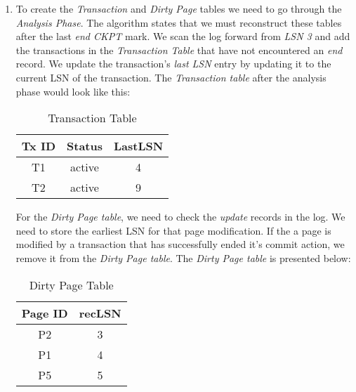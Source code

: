 \documentclass{article}      %
\begin{document}
\begin{enumerate}
\item %

To create the \emph{Transaction} and \emph{Dirty Page} tables we need to go through the \emph{Analysis Phase}. The algorithm states that we must reconstruct these tables after the last \emph{end CKPT} mark. We scan the log forward from \emph{LSN 3} and add the transactions in the \emph{Transaction Table} that have not encountered an \emph{end} record. We update the transaction's  \emph{last LSN} entry by updating it to the current LSN of the transaction. The \emph{Transaction table} after the analysis phase would look like this: \\

\begin{table}[h]
\begin{center}
\begin{tabular}{|c|c|c|}
\hline
\textbf{Tx ID} & \textbf{Status} & \textbf{LastLSN} \\ \hline
T1             & active          & 4                \\ 
T2             & active          & 9                \\ \hline
\end{tabular}
\caption{Transaction Table}
\label{Transaction Table}
\end{center}
\end{table}

For the \emph{Dirty Page table}, we need to check the \emph{update} records in the log. We need to store the earliest LSN for that page modification. If the a page is modified by a transaction that has successfully ended it's commit action, we remove it from the \emph{Dirty Page table}. The \emph{Dirty Page table} is presented below:\\

\begin{table}[h]
\begin{center}
\begin{tabular}{|c|c|}
\hline
\textbf{Page ID} & \textbf{recLSN} \\ 
\hline
P2               & 3               \\
P1               & 4               \\
P5               & 5               \\ 
\hline
\end{tabular}
\caption{Dirty Page Table}
\label{Dirty Page Table}
\end{center}
\end{table}


\end{enumerate}
\end{document}
